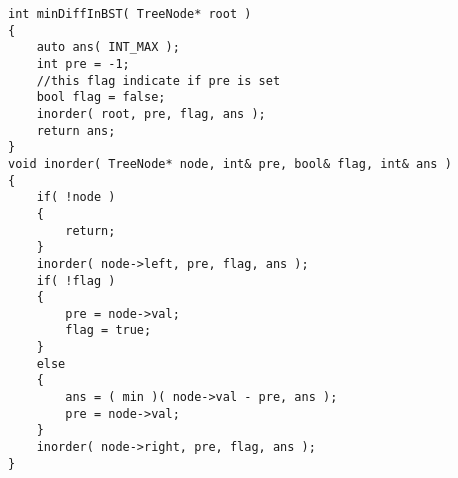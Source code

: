 \setcounter{lstlisting}{0}
\begin{lstlisting}[style=customc, caption={Inorder Traverse}]
int minDiffInBST( TreeNode* root )
{
    auto ans( INT_MAX );
    int pre = -1;
    //this flag indicate if pre is set
    bool flag = false;
    inorder( root, pre, flag, ans );
    return ans;
}
void inorder( TreeNode* node, int& pre, bool& flag, int& ans )
{
    if( !node )
    {
        return;
    }
    inorder( node->left, pre, flag, ans );
    if( !flag )
    {
        pre = node->val;
        flag = true;
    }
    else
    {
        ans = ( min )( node->val - pre, ans );
        pre = node->val;
    }
    inorder( node->right, pre, flag, ans );
}
\end{lstlisting}